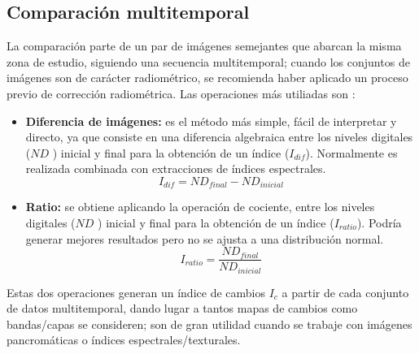 \subsection{Comparaci\'on multitemporal}\label{subsec:compMult}
La comparaci\'on parte de un par de im\'agenes semejantes que abarcan la misma zona de estudio, siguiendo una secuencia multitemporal; cuando los conjuntos de im\'agenes son de car\'acter radiom\'etrico, se recomienda haber aplicado un proceso previo de correcci\'on radiom\'etrica. Las operaciones m\'as utiliadas son \cite{chuvieco1998factor}: 
	\begin{itemize}
		\item \textbf{Diferencia de im\'agenes:} es el m\'etodo m\'as simple, f\'acil de interpretar y directo, ya que consiste en una diferencia algebraica entre los niveles digitales ($ ND $ ) inicial y final para la obtenci\'on de un \'indice ($ I_{dif} $). Normalmente es realizada combinada  con extracciones de \'indices espectrales.
								\begin{equation}
								I_{dif} = ND_{final}-ND_{inicial}
								\end{equation} 	
				\item \textbf{Ratio:} se obtiene aplicando la operación de cociente, entre los niveles digitales ($ ND $ ) inicial y final para la obtenci\'on de un \'indice ($ I_{ratio} $). Podr\'ia  generar mejores resultados pero no se ajusta a una distribución normal.
										\begin{equation}
										I_{ratio} = \dfrac{ND_{final}}{ND_{inicial}}
										\end{equation} 	

		\end{itemize}
Estas dos operaciones generan un \'indice de cambios $ I_{c}$ a partir de cada conjunto de datos multitemporal, dando lugar a tantos mapas de cambios como bandas/capas se consideren; son de gran utilidad cuando se trabaje con im\'agenes pancrom\'aticas o \'indices espectrales/texturales.
